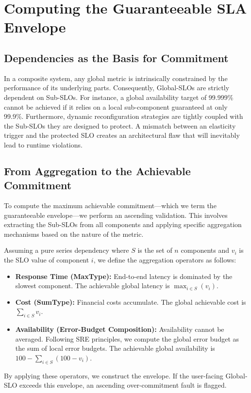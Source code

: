 \documentclass[conference]{IEEEtran}
\begin{document}
\section{Computing the Guaranteeable SLA Envelope}\label{sec:approach}

\subsection{Dependencies as the Basis for Commitment}\label{sec:dep}
In a composite system, any global metric is intrinsically constrained by the performance of its underlying parts. Consequently, Global-SLOs are strictly dependent on Sub-SLOs. For instance, a global availability target of 99.999\% cannot be achieved if it relies on a local sub-component guaranteed at only 99.9\%. Furthermore, dynamic reconfiguration strategies are tightly coupled with the Sub-SLOs they are designed to protect. A mismatch between an elasticity trigger and the protected SLO creates an architectural flaw that will inevitably lead to runtime violations.

\subsection{From Aggregation to the Achievable Commitment}\label{sec:agg}
To compute the maximum achievable commitment—which we term the guaranteeable envelope—we perform an ascending validation. This involves extracting the Sub-SLOs from all components and applying specific aggregation mechanisms based on the nature of the metric. 

Assuming a pure series dependency where $S$ is the set of $n$ components and $v_i$ is the SLO value of component $i$, we define the aggregation operators as follows:
\begin{itemize}
    \item \textbf{Response Time (MaxType):} End-to-end latency is dominated by the slowest component. The achievable global latency is $\max_{i \in S}(v_i)$.
    \item \textbf{Cost (SumType):} Financial costs accumulate. The global achievable cost is $\sum_{i \in S}v_i$.
    \item \textbf{Availability (Error-Budget Composition):} Availability cannot be averaged. Following SRE principles, we compute the global error budget as the sum of local error budgets. The achievable global availability is $100 - \sum_{i \in S}(100 - v_i)$.
\end{itemize}
By applying these operators, we construct the envelope. If the user-facing Global-SLO exceeds this envelope, an ascending over-commitment fault is flagged.
\end{document}

